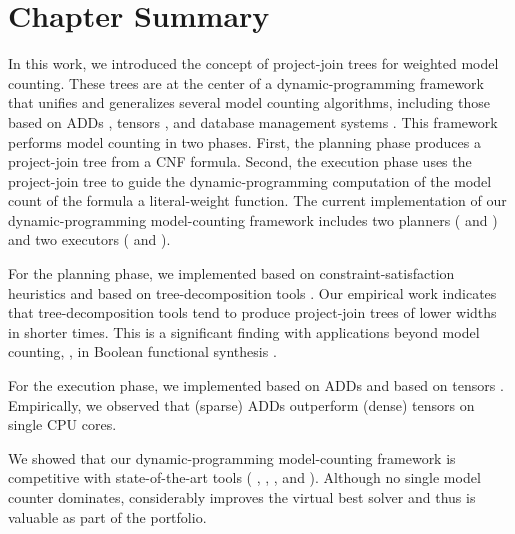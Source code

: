 \section{Chapter Summary}
\label{sec_discussion}

In this work, we introduced the concept of project-join trees for weighted model counting.
These trees are at the center of a dynamic-programming framework that unifies and generalizes several model counting algorithms, including those based on ADDs \cite{DPV20}, tensors \cite{DDV19}, and database management systems \cite{fichte2020exploiting}.
This framework performs model counting in two phases.
First, the planning phase produces a project-join tree from a CNF formula.
Second, the execution phase uses the project-join tree to guide the dynamic-programming computation of the model count of the formula \wrt{} a literal-weight function.
The current implementation of our dynamic-programming model-counting framework \Dpmc{} includes two planners (\Htb{} and \Lg) and two executors (\Dmc{} and \Tensor{}).

For the planning phase, we implemented \Htb{} based on constraint-satisfaction heuristics
\cite{tarjan1984simple,koster2001treewidth,dechter03,dechter99,bouquet1999gestion}
and \Lg{} based on tree-decomposition tools \cite{strasser2017computing,Tamaki17,AMW17}.
Our empirical work indicates that tree-decomposition tools tend to produce project-join trees of lower widths in shorter times.
This is a significant finding with applications beyond model counting, \eg, in Boolean functional synthesis \cite{tabajara2017factored}.

For the execution phase, we implemented \Dmc{} based on ADDs \cite{DPV20,somenzi2015cudd} and \Tensor{} based on tensors \cite{numpy}.
Empirically, we observed that (sparse) ADDs outperform (dense) tensors on single CPU cores.

We showed that our dynamic-programming model-counting framework \Dpmc{} is competitive with state-of-the-art tools (\cachet{} \cite{sang2004combining}, \ctd{} \cite{darwiche2004new}, \df{} \cite{LM17}, and \minictd{} \cite{OD15}).
Although no single model counter dominates, \Dpmc{} considerably improves the virtual best solver and thus is valuable as part of the portfolio.